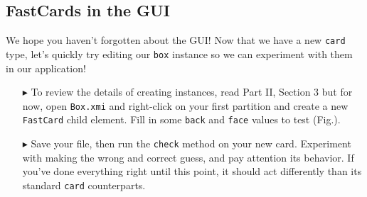 \newpage
\hypertarget{subsec:fastGUI}{}
\subsection{FastCards in the GUI}
\genHeader

We hope you haven't forgotten about the GUI! Now that we have a new \texttt{card} type, let's quickly try editing our \texttt{box} instance so we can experiment
with them in our application!

\begin{itemize}
  
\item[$\blacktriangleright$] To review the details of creating instances, read Part II, Section 3 but for now, open \texttt{Box.xmi} and right-click on your
first partition and create a new \texttt{FastCard} child element. Fill in some \texttt{back} and \texttt{face} values to test (Fig.). \update

\item[$\blacktriangleright$] Save your file, then run the \texttt{check} method on your new card. Experiment with making the wrong and correct guess, and pay
attention its behavior. If you've done everything right until this point, it should act differently than its standard \texttt{card} counterparts.

\end{itemize}
